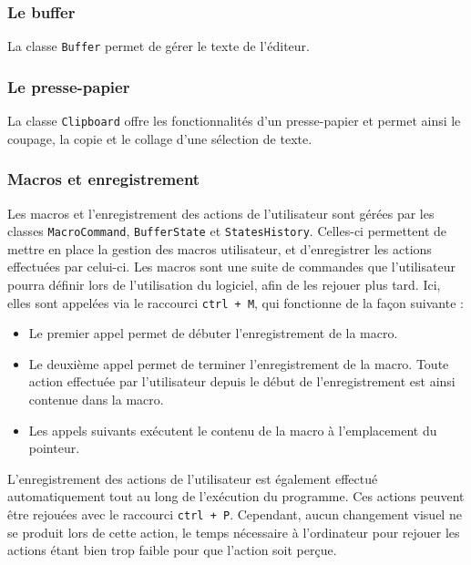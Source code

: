 \documentclass[a4paper]{article}
\begin{document}
			\subsubsection{Le buffer}

			La classe \texttt{Buffer} permet de gérer le texte de l'éditeur.

			\subsubsection{Le presse-papier}

			La classe \texttt{Clipboard} offre les fonctionnalités d'un presse-papier et permet ainsi le coupage, la copie et le collage d'une sélection de texte.

			\subsubsection{Macros et enregistrement}

			Les macros et l'enregistrement des actions de l'utilisateur sont gérées par les classes \texttt{MacroCommand}, \texttt{BufferState} et \texttt{StatesHistory}. Celles-ci permettent de mettre en place la gestion des macros utilisateur, et d’enregistrer les actions effectuées par celui-ci. Les macros sont une suite de commandes que l’utilisateur pourra définir lors de l’utilisation du logiciel, afin de les rejouer plus tard. Ici, elles sont appelées via le raccourci \texttt{ctrl + M}, qui fonctionne de la façon suivante :

			\begin{itemize}
				\item Le premier appel permet de débuter l’enregistrement de la macro.

				\item Le deuxième appel permet de terminer l’enregistrement de la macro. Toute action effectuée par l’utilisateur depuis le début de l’enregistrement est ainsi contenue dans la macro.

				\item Les appels suivants exécutent le contenu de la macro à l’emplacement du pointeur.
			\end{itemize}

			L’enregistrement des actions de l’utilisateur est également effectué automatiquement tout au long de l’exécution du programme. Ces actions peuvent être rejouées avec le raccourci \texttt{ctrl + P}. Cependant, aucun changement visuel ne se produit lors de cette action, le temps nécessaire à l’ordinateur pour rejouer les actions étant bien trop faible pour que l’action soit perçue.
\end{document}
